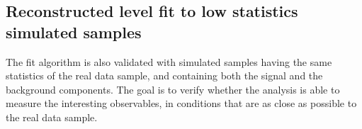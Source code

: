 




\subsection{Reconstructed level fit to low statistics simulated samples}
\label{sec:datalike-MC}

The fit algorithm is also validated with simulated samples having the same statistics of the real data sample, and containing both the signal and the background components.
The goal is to verify whether the analysis is able to measure the interesting observables, in conditions that are as close as possible to the real data sample.

